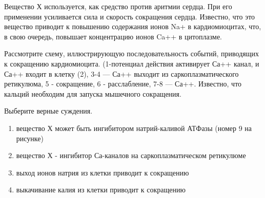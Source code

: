 
Вещество Х используется,
как средство против аритмии сердца. При его применении усиливается сила и
скорость сокращения сердца. Известно, что это вещество приводит к повышению содержания ионов Na+ в кардиомиоцитах, что, в свою очередь, повышает
концентрацию ионов Ca++ в цитоплазме.


Рассмотрите схему,
иллюстрирующую последовательность событий, приводящих к сокращению
кардиомиоцита. (1-потенциал действия активирует Са++ канал, и \linebreak Са++ входит в
клетку (2), 3-4 — Са++ выходит из саркоплазматического ретикулюма, 5 -
сокращение, 6 - расслабление, 7-8 — Са++. Известно, что кальций необходим для
запуска мышечного сокращения.

Выберите верные суждения.  

\begin{enumerate}
    \item вещество Х может быть ингибитором натрий-каливой АТФазы (номер 9 на рисунке)
    \item вещество Х - ингибитор Са-каналов на саркоплазматическом ретикулюме
    \item выход ионов натрия из клетки приводит к сокращению
    \item выкачивание калия из клетки приводит к сокращению
\end{enumerate}

